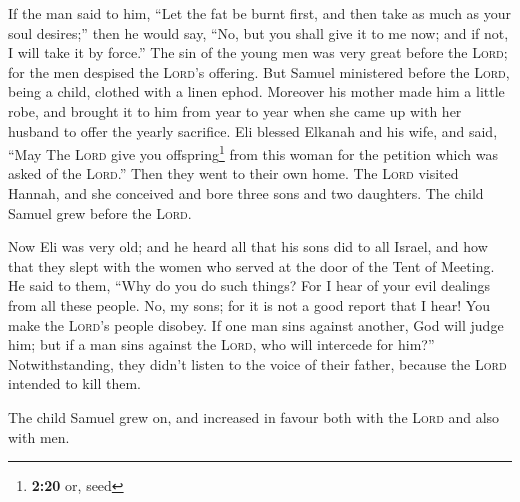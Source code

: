  If the man said to him, ``Let the fat be burnt first,
and then take as much as your soul desires;'' then he would say, ``No,
but you shall give it to me now; and if not, I will take it by force.''
 The sin of the young men was very great before the
\textsc{Lord}; for the men despised the \textsc{Lord}'s offering.
 But Samuel ministered before the \textsc{Lord}, being a
child, clothed with a linen ephod.  Moreover his mother
made him a little robe, and brought it to him from year to year when she
came up with her husband to offer the yearly sacrifice. 
Eli blessed Elkanah and his wife, and said, ``May The \textsc{Lord} give
you offspring\footnote{\textbf{2:20} or, seed} from this woman for the
petition which was asked of the \textsc{Lord}.'' Then they went to their
own home.  The \textsc{Lord} visited Hannah, and she
conceived and bore three sons and two daughters. The child Samuel grew
before the \textsc{Lord}.

 Now Eli was very old; and he heard all that his sons did
to all Israel, and how that they slept with the women who served at the
door of the Tent of Meeting.  He said to them, ``Why do
you do such things? For I hear of your evil dealings from all these
people.  No, my sons; for it is not a good report that I
hear! You make the \textsc{Lord}'s people disobey.  If
one man sins against another, God will judge him; but if a man sins
against the \textsc{Lord}, who will intercede for him?''
Notwithstanding, they didn't listen to the voice of their father,
because the \textsc{Lord} intended to kill them.

 The child Samuel grew on, and increased in favour both
with the \textsc{Lord} and also with men.

